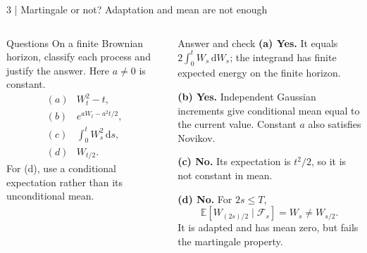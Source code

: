 \documentclass[handout,10pt,t,aspectratio=169]{beamer}
\newcommand{\E}{\mathbb E}
\newcommand{\F}{\mathcal F}
\newcommand{\dd}{\,\mathrm d}
\newenvironment{questions}{\begin{block}{Questions}}{\end{block}}
\newenvironment{answers}{\begin{exampleblock}{Answer and check}}{\end{exampleblock}}
\newcommand{\compact}{\small%
 \setlength{\abovedisplayskip}{3pt}%
 \setlength{\belowdisplayskip}{3pt}%
 \setlength{\abovedisplayshortskip}{2pt}%
 \setlength{\belowdisplayshortskip}{2pt}%
 \setlength{\parskip}{2pt}}
\begin{document}
\begin{frame}{3 | Martingale or not? Adaptation and mean are not enough}
\compact
\begin{columns}[T,onlytextwidth]
\begin{questions}
On a finite Brownian horizon, classify each process and justify the answer.
Here \(a\ne0\) is constant.
\[
 \begin{array}{ll}
 (a)&W_t^2-t,\\[.4em]
 (b)&e^{aW_t-a^2t/2},\\[.4em]
 (c)&\displaystyle\int_0^t W_s^2\dd s,\\[.8em]
 (d)&W_{t/2}.
 \end{array}
\]
For (d), use a conditional expectation rather than its unconditional mean.
\end{questions}
\begin{answers}
\textbf{(a) Yes.} It equals \(2\int_0^tW_s\dd W_s\);
the integrand has finite expected energy on the finite horizon.

\textbf{(b) Yes.} Independent Gaussian increments give conditional mean
equal to the current value. Constant \(a\) also satisfies Novikov.

\textbf{(c) No.} Its expectation is \(t^2/2\), so it is not constant in mean.

\textbf{(d) No.} For \(2s\leq T\),
\[
 \E[W_{(2s)/2}\mid\F_s]=W_s
 \ne W_{s/2}.
\]
It is adapted and has mean zero, but fails the martingale property.
\end{answers}
\end{columns}
\end{frame}
\end{document}
